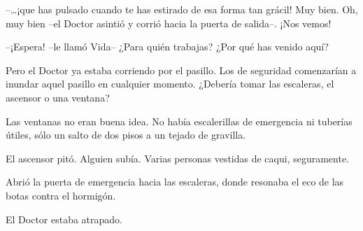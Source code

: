 {--\ldots{}¡que has pulsado cuando te has estirado de esa forma tan
 grácil! Muy bien. Oh, muy bien --el Doctor asintió y corrió hacia la
puerta de salida--. ¡Nos vemos!}

{--¡Espera! --le llamó Vida-- ¿Para quién trabajas? ¿Por qué has venido
aquí?}

{Pero el Doctor ya estaba corriendo por el pasillo. Los de seguridad
 comenzarían a inundar aquel pasillo en cualquier momento. ¿Debería tomar
las escaleras, el ascensor o una ventana?}

{Las ventanas no eran buena idea. No había escalerillas de emergencia ni
tuberías útiles, sólo un salto de dos pisos a un tejado de gravilla.}

{El ascensor pitó. Alguien subía. Varias personas vestidas de caqui,
seguramente.}

{Abrió la puerta de emergencia hacia las escaleras, donde resonaba el
eco de las botas contra el hormigón.}

{El Doctor estaba atrapado.}
